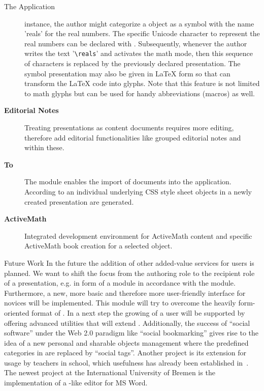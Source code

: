 \begin{omgroup}[id=cpoint,short=\cpoint,creators=ako]
\begin{omgroup}[id=cpoint.app]{The {\cpoint} Application}
\begin{description}
  instance, the author might categorize a {\ppt} object as a symbol with the name 'reals'
  for the real numbers. The specific Unicode character to represent the real numbers can
  be declared with {\cpoint}. Subsequently, whenever the author writes the text
  '\verb|\reals|' and activates the math mode, then this sequence of characters is
  replaced by the previously declared presentation. The symbol presentation may also be
  given in {\LaTeX} form so that {\texpoint} can transform the {\LaTeX} code into {\ppt}
  glyphs. Note that this feature is not limited to math glyphs but can be used for handy
  abbreviations (macros) as well.
\item[{\bf Editorial Notes}\twin{editorial}{note}] Treating {\ppt} presentations as
  content documents requires more editing, therefore {\cpnotes} add editorial
  functionalities like grouped editorial notes and {} within these.
\item[{\bf {\omdoc} To {\ppt}}] The {\cpimport} module enables the import of {\omdoc}
  documents into the {\ppt} application. According to an individual underlying CSS style sheet {\ppt}
  objects in a newly created {\ppt} presentation are generated.
\item[{\bf ActiveMath}] Integrated development environment for ActiveMath content and
  specific ActiveMath book creation for a selected {\ppt} object.
\end{description}
\end{omgroup}

\begin{omgroup}{Future Work}
In the future the addition of other added-value services for users is planned. We want to
shift the focus from the authoring role to the recipient role of a {\ppt} presentation,
e.g. in form of a {\cpstudent} module in accordance with the {\cpauthor} module.
Furthermore, a new, more basic and therefore more user-friendly interface for {\cpoint}
novices will be implemented. This {\cpbasic} module will try to overcome the heavily
form-oriented format of {\cpoint}. In a next step the growing of a {\cpoint} user will be
supported by offering advanced {\cpoint} utilities that will extend {\cpbasic}.
Additionally, the success of ``social software'' under the Web 2.0 paradigm like ``social
bookmarking'' gives rise to the idea of a new personal and sharable {\ppt} objects
management where the predefined categories in {\cpoint} are replaced by ``social tags''.
Another {\cpoint} project is its extension for usage by teachers in school, which
usefulness has already been established in~\cite{Kohlhase:emPowerPoint}. The newest
project at the International University of Bremen is the implementation of a
{\cpoint}-like editor for MS Word.
\end{omgroup}
\end{omgroup}

